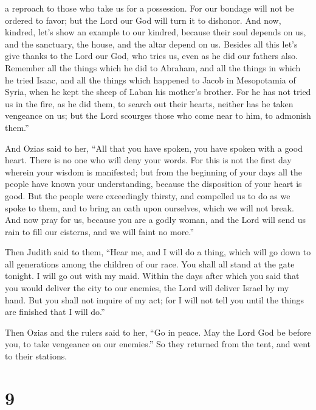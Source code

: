 a reproach to those who take us for a possession.  For
our bondage will not be ordered to favor; but the Lord our God will turn
it to dishonor.  And now, kindred, let's show an example
to our kindred, because their soul depends on us, and the sanctuary, the
house, and the altar depend on us.  Besides all this
let's give thanks to the Lord our God, who tries us, even as he did our
fathers also.  Remember all the things which he did to
Abraham, and all the things in which he tried Isaac, and all the things
which happened to Jacob in Mesopotamia of Syria, when he kept the sheep
of Laban his mother's brother.  For he has not tried us
in the fire, as he did them, to search out their hearts, neither has he
taken vengeance on us; but the Lord scourges those who come near to him,
to admonish them.''

 And Ozias said to her, ``All that you have spoken, you
have spoken with a good heart. There is no one who will deny your words.
 For this is not the first day wherein your wisdom is
manifested; but from the beginning of your days all the people have
known your understanding, because the disposition of your heart is good.
 But the people were exceedingly thirsty, and compelled
us to do as we spoke to them, and to bring an oath upon ourselves, which
we will not break.  And now pray for us, because you are
a godly woman, and the Lord will send us rain to fill our cisterns, and
we will faint no more.''

 Then Judith said to them, ``Hear me, and I will do a
thing, which will go down to all generations among the children of our
race.  You shall all stand at the gate tonight. I will go
out with my maid. Within the days after which you said that you would
deliver the city to our enemies, the Lord will deliver Israel by my
hand.  But you shall not inquire of my act; for I will
not tell you until the things are finished that I will do.''

 Then Ozias and the rulers said to her, ``Go in peace.
May the Lord God be before you, to take vengeance on our enemies.''
 So they returned from the tent, and went to their
stations.

\hypertarget{section-8}{%
\section{9}\label{section-8}}

